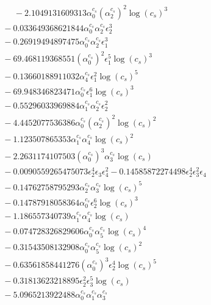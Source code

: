 \documentclass[10pt]{article}
\begin{document}
\begin{align*}
\phantom{F_{s,7}} &\phantom{={}}{}  - 2.1049131609313 \alpha_{0}^{c_s} \left(\alpha_{2}^{c_s}\right)^{2} \log{\left(c_{s} \right)}^{3} \\
&{}  - 0.033649368621844 \alpha_{0}^{c_s} \alpha_{2}^{c_s} \epsilon_{2}^{3} \\
&{}  - 0.26919494897475 \alpha_{0}^{c_s} \alpha_{2}^{c_s} \epsilon_{1}^{3} \\
&{}  - 69.468119368551 \left(\alpha_{0}^{c_s}\right)^{2} \epsilon_{1}^{5} \log{\left(c_{s} \right)}^{3} \\
&{}  - 0.13660188911032 \alpha_{4}^{c_s} \epsilon_{1}^{2} \log{\left(c_{s} \right)}^{5} \\
&{}  - 69.948346823471 \alpha_{0}^{c_s} \epsilon_{1}^{6} \log{\left(c_{s} \right)}^{3} \\
&{}  - 0.55296033969884 \alpha_{1}^{c_s} \alpha_{2}^{c_s} \epsilon_{2}^{2} \\
&{}  - 4.4452077536386 \alpha_{0}^{c_s} \left(\alpha_{2}^{c_s}\right)^{2} \log{\left(c_{s} \right)}^{2} \\
&{}  - 1.123507865353 \alpha_{1}^{c_s} \alpha_{4}^{c_s} \log{\left(c_{s} \right)}^{2} \\
&{}  - 2.2631174107503 \left(\alpha_{0}^{c_s}\right)^{3} \alpha_{3}^{c_s} \log{\left(c_{s} \right)} \\
&{}  - 0.0090559265475073 \epsilon_{2}^{4} \epsilon_{3} \epsilon_{4}^{2} - 0.14585872274498 \epsilon_{2}^{4} \epsilon_{3}^{2} \epsilon_{4} \\
&{}  - 0.14762758795293 \alpha_{2}^{c_s} \alpha_{3}^{c_s} \log{\left(c_{s} \right)}^{5} \\
&{}  - 0.14787918058364 \alpha_{0}^{c_s} \epsilon_{2}^{6} \log{\left(c_{s} \right)}^{3} \\
&{}  - 1.186557340739 \alpha_{1}^{c_s} \alpha_{4}^{c_s} \log{\left(c_{s} \right)} \\
&{}  - 0.074728326829606 \alpha_{0}^{c_s} \alpha_{5}^{c_s} \log{\left(c_{s} \right)}^{4} \\
&{}  - 0.31543508132908 \alpha_{0}^{c_s} \alpha_{5}^{c_s} \log{\left(c_{s} \right)}^{2} \\
&{}  - 0.63561858441276 \left(\alpha_{0}^{c_s}\right)^{3} \epsilon_{2}^{4} \log{\left(c_{s} \right)}^{5} \\
&{}  - 0.31813623218895 \epsilon_{2}^{2} \epsilon_{3}^{5} \log{\left(c_{s} \right)} \\
&{}  - 5.0965213922488 \alpha_{0}^{c_s} \alpha_{1}^{c_s} \alpha_{3}^{c_s} \\

\end{align*}
\end{document}
